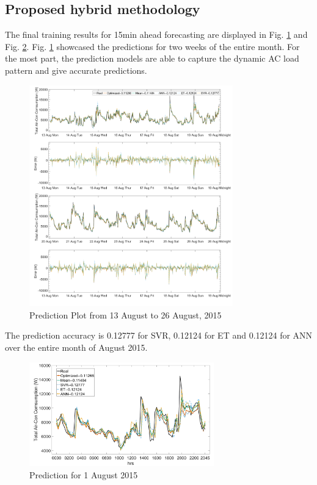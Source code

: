 \documentclass[conference]{IEEEtran}
\begin{document}
\subsection{Proposed hybrid methodology}
The final training results for 15min ahead forecasting are displayed in Fig. \ref{wholetestset} and Fig. \ref{dayprediction}. Fig. \ref{wholetestset} showcased the predictions for two weeks of the entire month. For the most part, the prediction models are able to capture the dynamic AC load pattern and give accurate predictions.   
\begin{figure}[htb!]\centering \footnotesize
	\includegraphics[width=88mm]{2weeks}
	\caption{Prediction Plot from 13 August to 26 August, 2015}
	\vspace{-0.3cm}
	\label{wholetestset}
\end{figure}
 The prediction accuracy is 0.12777 for SVR, 0.12124 for ET and 0.12124 for ANN over the entire month of August 2015.
 \begin{figure}[htb!]\centering \footnotesize
 	\includegraphics[width=80mm]{prediction}
 	\caption{Prediction for 1 August 2015}
 	\vspace{-0.3cm}
 	\label{dayprediction}
 \end{figure}
\end{document}
